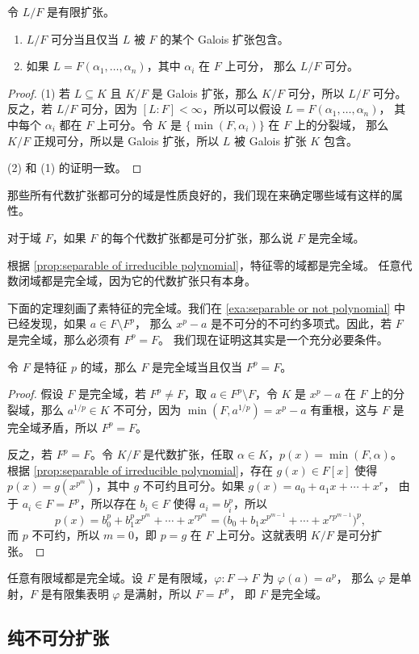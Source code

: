 \begin{corollary}
  令 $L/F$ 是有限扩张。
  \begin{enumerate}
    \item $L/F$ 可分当且仅当 $L$ 被 $F$ 的某个 Galois 扩张包含。
    \item 如果 $L=F(\alpha_1,\dots,\alpha_n)$，其中 $\alpha_i$ 在 $F$ 上可分，
    那么 $L/F$ 可分。
  \end{enumerate}
\end{corollary}
\begin{proof}
  (1) 若 $L\subseteq K$ 且 $K/F$ 是 Galois 扩张，那么 $K/F$ 可分，所以 $L/F$ 可分。
  反之，若 $L/F$ 可分，因为 $[L:F]<\infty$，所以可以假设 $L=F(\alpha_1,\dots,\alpha_n)$，
  其中每个 $\alpha_i$ 都在 $F$ 上可分。令 $K$ 是 $\{\min(F,\alpha_i)\}$ 在 $F$ 上的分裂域，
  那么 $K/F$ 正规可分，所以是 Galois 扩张，所以 $L$ 被 Galois 扩张 $K$ 包含。

  (2) 和 (1) 的证明一致。
\end{proof}

那些所有代数扩张都可分的域是性质良好的，我们现在来确定哪些域有这样的属性。

\begin{definition}
  对于域 $F$，如果 $F$ 的每个代数扩张都是可分扩张，那么说 $F$ 是完全域。
\end{definition}

\begin{example}
  根据 \autoref{prop:separable of irreducible polynomial}，特征零的域都是完全域。
  任意代数闭域都是完全域，因为它的代数扩张只有本身。
\end{example}

下面的定理刻画了素特征的完全域。我们在 \autoref{exa:separable or not polynomial} 中已经发现，如果 $a\in F\setminus F^p$，
那么 $x^p-a$ 是不可分的不可约多项式。因此，若 $F$ 是完全域，那么必须有 $F^p=F$。
我们现在证明这其实是一个充分必要条件。

\begin{theorem}
  令 $F$ 是特征 $p$ 的域，那么 $F$ 是完全域当且仅当 $F^p=F$。
\end{theorem}
\begin{proof}
  假设 $F$ 是完全域，若 $F^p\neq F$，取 $a\in F^p\setminus F$，令 $K$
  是 $x^p-a$ 在 $F$ 上的分裂域，那么 $a^{1/p}\in K$ 不可分，因为 $\min(F,a^{1/p})=x^p-a$
  有重根，这与 $F$ 是完全域矛盾，所以 $F^p=F$。

  反之，若 $F^p=F$。令 $K/F$ 是代数扩张，任取 $\alpha\in K$，$p(x)=\min(F,\alpha)$。
  根据 \autoref{prop:separable of irreducible polynomial}，存在 $g(x)\in F[x]$
  使得 $p(x)=g(x^{p^m})$，其中 $g$ 不可约且可分。如果 $g(x)=a_0+a_1x+\cdots+x^r$，
  由于 $a_i\in F=F^p$，所以存在 $b_i\in F$ 使得 $a_i=b_i^p$，所以
  \[
    p(x)=b_0^p+b_1^px^{p^m}+\cdots+x^{rp^{m}}=\bigl(b_0+b_1x^{p^{m-1}}+\cdots+x^{rp^{m-1}}\bigr)^p,
  \]
  而 $p$ 不可约，所以 $m=0$，即 $p=g$ 在 $F$ 上可分。这就表明 $K/F$ 是可分扩张。
\end{proof}

\begin{example}
  任意有限域都是完全域。设 $F$ 是有限域，$\varphi:F\to F$ 为 $\varphi(a)=a^p$，
  那么 $\varphi$ 是单射，$F$ 是有限集表明 $\varphi$ 是满射，所以 $F=F^p$，
  即 $F$ 是完全域。
\end{example}

\subsection{纯不可分扩张}






